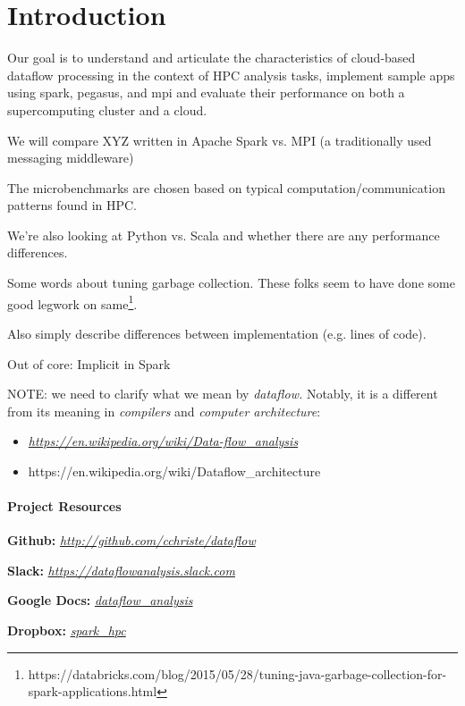 \section{Introduction}

Our goal is to understand and articulate the characteristics of
cloud-based dataflow processing in the context of HPC analysis tasks,
implement sample apps using spark, pegasus, and mpi and evaluate their
performance on both a supercomputing cluster and a cloud.

We will compare XYZ written in Apache Spark vs. MPI (a traditionally
used messaging middleware)

The microbenchmarks are chosen based on typical
computation/communication patterns found in HPC.

We're also looking at Python vs. Scala and whether there are any
performance differences.

Some words about tuning garbage collection. These folks seem to have
done some good legwork on same\footnote{https://databricks.com/blog/2015/05/28/tuning-java-garbage-collection-for-spark-applications.html}.

Also simply describe differences between implementation (e.g. lines of
code).

Out of core: Implicit in Spark

NOTE: we need to clarify what we mean by \emph{dataflow.} Notably, it is a different from its meaning in \emph{compilers} and \emph{computer architecture}:
\begin{itemize}
\item
  \href{https://en.wikipedia.org/wiki/Data-flow_analysis}{\emph{https://en.wikipedia.org/wiki/Data-flow\_analysis}}
\item
  https://en.wikipedia.org/wiki/Dataflow\_architecture
\end{itemize}

\paragraph{Project Resources}\label{project-resources}

\textbf{Github:}
\href{http://github.com/cchriste/dataflow}{\emph{http://github.com/cchriste/dataflow}}

\textbf{Slack:}
\href{https://dataflowanalysis.slack.com}{\emph{https://dataflowanalysis.slack.com}}

\textbf{Google Docs:}
\href{https://drive.google.com/folderview?id=0BxLkEMNd9q6FfmpRaFZXSGlPc0JsSDdVdndCUm83SzN6UnlLVEk5T3ZsZmJ0VEVGREtNTkE\&usp=sharing}{\emph{dataflow\_analysis}}

\textbf{Dropbox:}
\href{https://www.dropbox.com/sh/odsd9uxe1elbhbf/AAD8J1TGuFY1VHJl2oPdm5E0a?dl=0}{\emph{spark\_hpc}}


